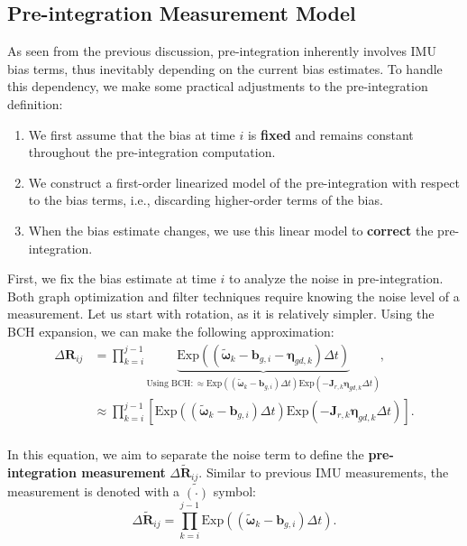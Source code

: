 \subsection{Pre-integration Measurement Model}
As seen from the previous discussion, pre-integration inherently involves IMU bias terms, thus inevitably depending on the current bias estimates. To handle this dependency, we make some practical adjustments to the pre-integration definition:
\begin{enumerate}
	\item We first assume that the bias at time $i$ is \textbf{fixed} and remains constant throughout the pre-integration computation.
	\item We construct a first-order linearized model of the pre-integration with respect to the bias terms, i.e., discarding higher-order terms of the bias.
	\item When the bias estimate changes, we use this linear model to \textbf{correct} the pre-integration.
\end{enumerate}

First, we fix the bias estimate at time $i$ to analyze the noise in pre-integration. Both graph optimization and filter techniques require knowing the noise level of a measurement. Let us start with rotation, as it is relatively simpler. Using the BCH expansion, we can make the following approximation:
\begin{equation}\label{key}
	\begin{aligned}
		\Delta \mathbf{R}_{ij} &= \prod_{k=i}^{j-1} \underbrace{\mathrm{Exp} \left( 
			\left(\tilde{\boldsymbol{\omega}}_k - \mathbf{b}_{g,i} - \boldsymbol{\eta}_{gd, k}\right)  \Delta 
			t\right)}_{\text{Using BCH}: \approx \mathrm{Exp}\left((\tilde{\boldsymbol{\omega}}_k - \mathbf{b}_{g,i})
			\Delta t \right) \mathrm{Exp} \left(-\mathbf{J}_{r,k} \boldsymbol{\eta}_{gd, k} \Delta t \right) }, \\
		&\approx \prod_{k=i}^{j-1} \left[ \mathrm{Exp}\left((\tilde{\boldsymbol{\omega}}_k - \mathbf{b}_{g,i}) 
		\Delta t \right) \mathrm{Exp} \left(-\mathbf{J}_{r,k} \boldsymbol{\eta}_{gd, k} \Delta t \right) \right].  \\
	\end{aligned}
\end{equation}

In this equation, we aim to separate the noise term to define the \textbf{pre-integration measurement} $\Delta \tilde{\mathbf{R}}_{ij}$. Similar to previous IMU measurements, the measurement is denoted with a $\tilde{(\cdot)}$ symbol:
\begin{equation}\label{eq:def-of-delta-R-obs}
	\Delta \tilde{\mathbf{R}}_{ij} = \prod_{k=i}^{j-1} \mathrm{Exp}\left( (\tilde{\boldsymbol{\omega}}_k - 
	\mathbf{b}_{g,i})\Delta t \right).
\end{equation}

